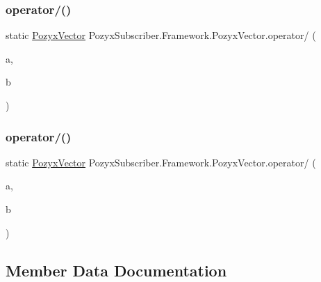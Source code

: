 \subsubsection{\texorpdfstring{operator/()}{operator/()}\hspace{0.1cm}{\footnotesize\ttfamily [1/2]}}
{\footnotesize\ttfamily static \hyperlink{struct_pozyx_subscriber_1_1_framework_1_1_pozyx_vector}{Pozyx\+Vector} Pozyx\+Subscriber.\+Framework.\+Pozyx\+Vector.\+operator/ (\begin{DoxyParamCaption}\item[{\hyperlink{struct_pozyx_subscriber_1_1_framework_1_1_pozyx_vector}{Pozyx\+Vector}}]{a,  }\item[{\hyperlink{struct_pozyx_subscriber_1_1_framework_1_1_pozyx_vector}{Pozyx\+Vector}}]{b }\end{DoxyParamCaption})\hspace{0.3cm}{\ttfamily [static]}}

\mbox{\label{struct_pozyx_subscriber_1_1_framework_1_1_pozyx_vector_a68df6b4b698e4a585d613bb7b5763a26}} 
\subsubsection{\texorpdfstring{operator/()}{operator/()}\hspace{0.1cm}{\footnotesize\ttfamily [2/2]}}
{\footnotesize\ttfamily static \hyperlink{struct_pozyx_subscriber_1_1_framework_1_1_pozyx_vector}{Pozyx\+Vector} Pozyx\+Subscriber.\+Framework.\+Pozyx\+Vector.\+operator/ (\begin{DoxyParamCaption}\item[{\hyperlink{struct_pozyx_subscriber_1_1_framework_1_1_pozyx_vector}{Pozyx\+Vector}}]{a,  }\item[{float}]{b }\end{DoxyParamCaption})\hspace{0.3cm}{\ttfamily [static]}}



\subsection{Member Data Documentation}
\mbox{\label{struct_pozyx_subscriber_1_1_framework_1_1_pozyx_vector_aaf687bd5085dd3c3f7898837f01c83d7}} 
